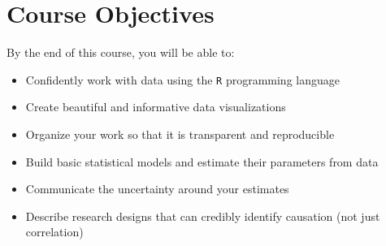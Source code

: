 \documentclass[11pt, letterpaper]{article}
\begin{document}
\section*{Course Objectives}
By the end of this course, you will be able to:
\begin{itemize}
	\item Confidently work with data using the \texttt{R} programming language
	\item Create beautiful and informative data visualizations
	\item Organize your work so that it is transparent and reproducible
	\item Build basic statistical models and estimate their parameters from data
	\item Communicate the uncertainty around your estimates
	\item Describe research designs that can credibly identify causation (not just correlation)
\end{itemize}
\end{document}
